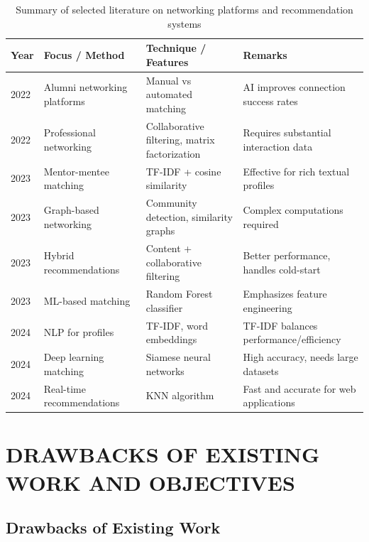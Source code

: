 \documentclass[12pt,a4paper]{report}
\let\origsection\section
\renewcommand{\section}{\needspace{4\baselineskip}\origsection}
\begin{document}
\begin{table}[h!]
\centering
\caption{Summary of selected literature on networking platforms and recommendation systems}
\label{tab:lit-summary}
\begin{tabular}{p{1.8cm}p{4.3cm}p{4.5cm}p{3cm}}
\toprule
\textbf{Year} & \textbf{Focus / Method} & \textbf{Technique / Features} & \textbf{Remarks} \\
\midrule
2022 & Alumni networking platforms~\cite{Smith2022} & Manual vs automated matching & AI improves connection success rates \\
2022 & Professional networking~\cite{Chen2022} & Collaborative filtering, matrix factorization & Requires substantial interaction data \\
2023 & Mentor-mentee matching~\cite{Patel2023} & TF-IDF + cosine similarity & Effective for rich textual profiles \\
2023 & Graph-based networking~\cite{Kumar2023} & Community detection, similarity graphs & Complex computations required \\
2023 & Hybrid recommendations~\cite{Zhang2023} & Content + collaborative filtering & Better performance, handles cold-start \\
2023 & ML-based matching~\cite{Mehta2023} & Random Forest classifier & Emphasizes feature engineering \\
2024 & NLP for profiles~\cite{Ahmed2024} & TF-IDF, word embeddings & TF-IDF balances performance/efficiency \\
2024 & Deep learning matching~\cite{Wang2024} & Siamese neural networks & High accuracy, needs large datasets \\
2024 & Real-time recommendations~\cite{Das2024} & KNN algorithm & Fast and accurate for web applications \\
\bottomrule
\end{tabular}
\end{table}


\chapter{DRAWBACKS OF EXISTING WORK AND OBJECTIVES}
\thispagestyle{fancy}

\section{Drawbacks of Existing Work}
\end{document}
